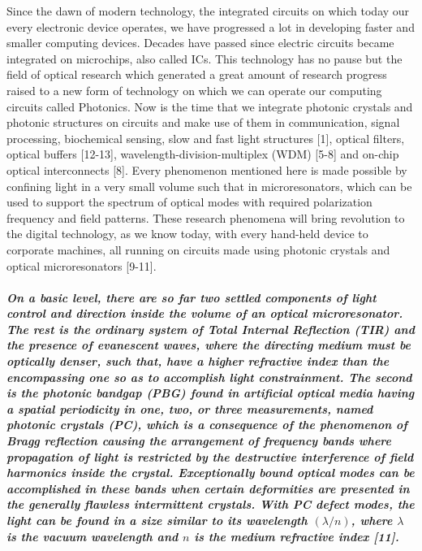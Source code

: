 \normalfont \large Since the dawn of modern technology, the integrated circuits on which today our every electronic device operates, we have progressed a lot in developing faster and smaller computing devices. Decades have passed since electric circuits became integrated on microchips, also called ICs. This technology has no pause but the field of optical research which generated a great amount of research progress raised to a new form of technology on which we can operate our computing circuits called Photonics. Now is the time that we integrate photonic crystals and photonic structures on circuits and make use of them in communication, signal processing, biochemical sensing, slow and fast light structures [1], optical filters, optical buffers [12-13], wavelength-division-multiplex (WDM) [5-8] and on-chip optical interconnects [8]. Every phenomenon mentioned here is made possible by confining light in a very small volume such that in microresonators, which can be used to support the spectrum of optical modes with required polarization frequency and field patterns. These research phenomena will bring revolution to the digital technology, as we know today, with every hand-held device to corporate machines, all running on circuits made using photonic crystals and optical microresonators [9-11]. 
\subparagraph{\normalfont \large On a basic level, there are so far two settled components of light control and direction inside the volume of an optical microresonator. The rest is the ordinary system of Total Internal Reflection (TIR) and the presence of evanescent waves, where the directing medium must be optically denser, such that, have a higher refractive index than the encompassing one so as to accomplish light constrainment. The second is the photonic bandgap (PBG) found in artificial optical media having a spatial periodicity in one, two, or three measurements, named photonic crystals (PC), which is a consequence of the phenomenon of Bragg reflection causing the arrangement of frequency bands where propagation of light is restricted by the destructive interference of field harmonics inside the crystal. Exceptionally bound optical modes can be accomplished in these bands when certain deformities are presented in the generally flawless intermittent crystals. With PC defect modes, the light can be found in a size similar to its wavelength $(\lambda/n)$, where $\lambda$ is the vacuum wavelength and $n$ is the medium refractive index [11].}

